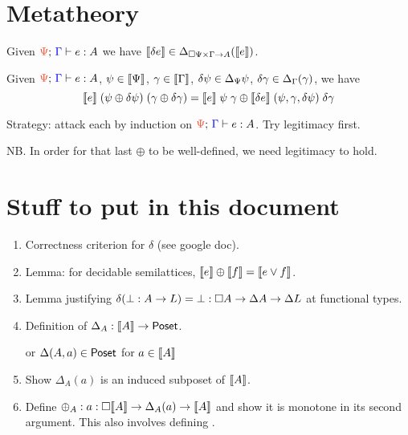 \documentclass{article}
\begin{document}

\section{Metatheory}


\begin{theorem}[Legitimacy]
  Given $\J{\GP}{\GG}{e}{A}$ we have $\llbracket{\delta e}\rrbracket \in \Delta_{\square{\Psi} \times \Gamma
    \to A}(\llbracket{e}\rrbracket)$.
\end{theorem}

\begin{theorem}[Correctness]
  Given $\J{\GP}{\GG}{e}{A}$, $\psi \in {\left\llbracket{\Psi}\right\rrbracket}$, $\gamma \in {\left\llbracket{\Gamma}\right\rrbracket}$,
  $\delta\psi \in \Delta_\Psi{\psi}$, $\delta\gamma \in \Delta_\Gamma(\gamma)$, we have
  \begin{equation*}
    \llbracket{e}\rrbracket\; (\psi \oplus \delta \psi)\; (\gamma \oplus \delta\gamma)
    =
    \llbracket{e}\rrbracket\; \psi\; \gamma \oplus
    \llbracket{\delta e}\rrbracket\;(\psi, \gamma, \delta \psi) \; \delta\gamma
  \end{equation*}
\end{theorem}

Strategy: attack each by induction on $\J{\GP}{\GG}{e}{A}$. Try legitimacy
first.

NB. In order for that last $\oplus$ to be well-defined, we need legitimacy to
hold.


\section{Stuff to put in this document}

\begin{enumerate}
\item Correctness criterion for $\delta$ (see google doc).
\item Lemma: for decidable semilattices, $\llbracket{e}\rrbracket \oplus \llbracket{f}\rrbracket = \llbracket{e \vee
  f}\rrbracket$.
\item Lemma justifying $\delta (\bot : A \to L) = \bot : \square{A} \to
  \Delta{A} \to \Delta{L}$ at functional types.
\item Definition of $\Delta_A : {\left\llbracket{A}\right\rrbracket} \to \mathsf{Poset}$.

  or $\Delta(A, a) \in \mathsf{Poset}$ for $a \in {\left\llbracket{A}\right\rrbracket}$
\item Show $\Delta_A(a)$ is an induced subposet of ${\left\llbracket{A}\right\rrbracket}$.
\item Define $\oplus_A : a : \square{{\left\llbracket{A}\right\rrbracket}} \to \Delta_A(a) \to {\left\llbracket{A}\right\rrbracket}$ and show it
  is monotone in its second argument. This also involves defining \zero.
\end{enumerate}
\end{document}
